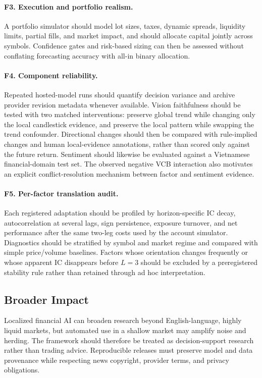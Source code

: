 \paragraph{F3. Execution and portfolio realism.}
A portfolio simulator should model lot sizes, taxes, dynamic spreads, liquidity limits, partial fills, and market impact, and should allocate capital jointly across symbols. Confidence gates and risk-based sizing can then be assessed without conflating forecasting accuracy with all-in binary allocation.

\paragraph{F4. Component reliability.}
Repeated hosted-model runs should quantify decision variance and archive provider revision metadata whenever available. Vision faithfulness should be tested with two matched interventions: preserve global trend while changing only the local candlestick evidence, and preserve the local pattern while swapping the trend confounder. Directional changes should then be compared with rule-implied changes and human local-evidence annotations, rather than scored only against the future return. Sentiment should likewise be evaluated against a Vietnamese financial-domain test set. The observed negative VCB interaction also motivates an explicit conflict-resolution mechanism between factor and sentiment evidence.

\paragraph{F5. Per-factor translation audit.}
Each registered adaptation should be profiled by horizon-specific IC decay, autocorrelation at several lags, sign persistence, exposure turnover, and net performance after the same two-leg costs used by the account simulator. Diagnostics should be stratified by symbol and market regime and compared with simple price/volume baselines. Factors whose orientation changes frequently or whose apparent IC disappears before $L=3$ should be excluded by a preregistered stability rule rather than retained through ad hoc interpretation.

\subsection{Broader Impact}

Localized financial AI can broaden research beyond English-language, highly liquid markets, but automated use in a shallow market may amplify noise and herding. The framework should therefore be treated as decision-support research rather than trading advice. Reproducible releases must preserve model and data provenance while respecting news copyright, provider terms, and privacy obligations.
